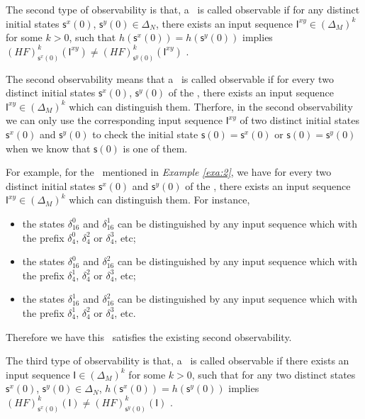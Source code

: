 \begin{definition}
	The second type of observability is that, a \BCN\ is called observable if for any distinct initial states $\mathsf{s}^{x}(0)$, $\mathsf{s}^{y}(0) \in \Delta_N$, there exists an input sequence $\mathsf{I}^{xy}\in(\Delta_M)^k$ for some $k>0$, such that $h(\mathsf{s}^{x}(0))=h(\mathsf{s}^{y}(0))$ implies $(HF)^k_{\mathsf{s}^{x}(0)}(\mathsf{I}^{xy})\neq (HF)^k_{\mathsf{s}^{y}(0)}(\mathsf{I}^{xy})$ \cite{Zhao2010Input}.
\end{definition}

The second observability means that a \BCN\ is called observable if for every two distinct initial states $\mathsf{s}^{x}(0)$, $\mathsf{s}^{y}(0)$ of the \BCN, there exists an input sequence $\mathsf{I}^{xy} \in(\Delta_M)^k$ which can distinguish them. Therfore, in the second observability we can only use the corresponding input sequence $\mathsf{I}^{xy}$ of two distinct initial states $\mathsf{s}^{x}(0)$ and $\mathsf{s}^{y}(0)$ to check the initial state $\mathsf{s}(0)=\mathsf{s}^{x}(0)$ or $\mathsf{s}(0)=\mathsf{s}^{y}(0)$ when we know that $\mathsf{s}(0)$ is one of them. 
\begin{example}
For example, for the \BCN\ mentioned in {\em Example \ref{exa:2}}, we have for every two distinct initial states $\mathsf{s}^{x}(0)$ and $\mathsf{s}^{y}(0)$ of the \BCN, there exists an input sequence $\mathsf{I}^{xy}\in(\Delta_M)^k$ which can distinguish them.  For instance,
\begin{itemize}
  \item the states $\delta_{16}^0$ and $\delta_{16}^1$ can be distinguished by any input sequence which with the prefix $\delta_{4}^0$, $\delta_{4}^2 $ or $\delta_{4}^3$, etc;
  \item the states $\delta_{16}^0$ and $\delta_{16}^2$  can be distinguished by any input sequence which with the prefix $\delta_{4}^1$, $\delta_{4}^2$ or $\delta_{4}^3$, etc;
  \item the states $\delta_{16}^1$ and $\delta_{16}^2$  can be distinguished by any input sequence which with the prefix $\delta_{4}^1$, $\delta_{4}^2$ or $\delta_{4}^3$, etc.
\end{itemize} 

Therefore we have this \BCN\ satisfies the existing second observability.
\label{exa:5}
\end{example}   
\begin{definition}
The third type of observability is that, a \BCN\ is called observable if there exists an input sequence $\mathsf{I}\in(\Delta_M)^k$ for some $k>0$, such that for any two distinct states $\mathsf{s}^{x}(0)$, $\mathsf{s}^{y}(0) \in \Delta_N$, $h(\mathsf{s}^{x}(0))=h(\mathsf{s}^{y}(0))$ implies $(HF)^k_{\mathsf{s}^{x}(0)}(\mathsf{I})\neq (HF)^k_{\mathsf{s}^{y}(0)}(\mathsf{I})$ \cite{Cheng2011Identification}.
\end{definition}

